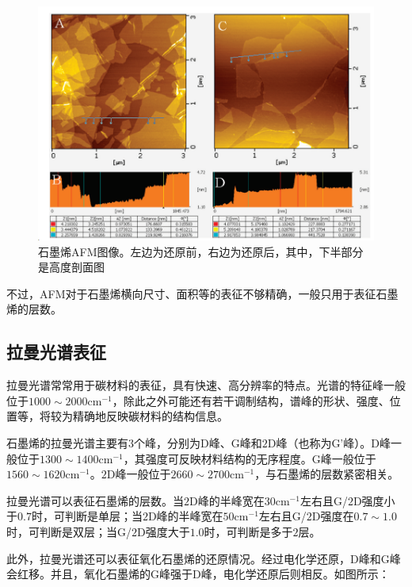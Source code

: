 \begin{figure}
    \centering
    \includegraphics[scale=0.4]{img/AFM}
    \caption{石墨烯AFM图像。左边为还原前，右边为还原后，其中，下半部分是高度剖面图}
    \label{fig:AFM}
\end{figure}

不过，AFM对于石墨烯横向尺寸、面积等的表征不够精确，一般只用于表征石墨烯的层数。

\subsection{拉曼光谱表征}

拉曼光谱常常用于碳材料的表征，具有快速、高分辨率的特点。光谱的特征峰一般位于$1000\sim 2000\mathrm{cm}^{-1}$，除此之外可能还有若干调制结构，谱峰的形状、强度、位置等，将较为精确地反映碳材料的结构信息\cite{RN14}。

石墨烯的拉曼光谱主要有$3$个峰，分别为D峰、G峰和$2$D峰（也称为G'峰）。D峰一般位于$1300\sim 1400\mathrm{cm}^{-1}$，其强度可反映材料结构的无序程度\cite{RN15}。G峰一般位于$1560\sim 1620\mathrm{cm}^{-1}$。$2$D峰一般位于$2660\sim 2700\mathrm{cm}^{-1}$，与石墨烯的层数紧密相关\cite{RN16}。

拉曼光谱可以表征石墨烯的层数。当$2$D峰的半峰宽在$30\mathrm{cm}^{-1}$左右且G/$2$D强度小于$0.7$时，可判断是单层；当$2$D峰的半峰宽在$50\mathrm{cm}^{-1}$左右且G/$2$D强度在$0.7\sim 1.0$时，可判断是双层；当G/$2$D强度大于$1.0$时，可判断是多于$2$层\cite{RN17}。

此外，拉曼光谱还可以表征氧化石墨烯的还原情况。经过电化学还原，D峰和G峰会红移。并且，氧化石墨烯的G峰强于D峰，电化学还原后则相反\cite{RN31}。如图所示：

